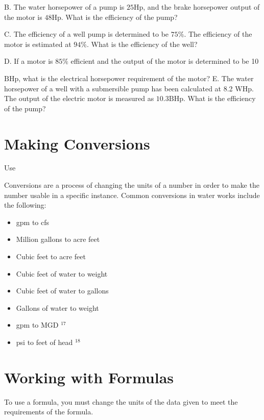 \documentclass[10pt]{article}
\begin{document}
B. The water horsepower of a pump is $25 \mathrm{Hp}$, and the brake horsepower output of the motor is $48 \mathrm{Hp}$. What is the efficiency of the pump?

C. The efficiency of a well pump is determined to be $75 \%$. The efficiency of the motor is estimated at $94 \%$. What is the efficiency of the well?

D. If a motor is $85 \%$ efficient and the output of the motor is determined to be 10

$\mathrm{BHp}$, what is the electrical horsepower requirement of the motor? E. The water horsepower of a well with a submersible pump has been calculated at 8.2 WHp. The output of the electric motor is measured as $10.3 \mathrm{BHp}$. What is the efficiency of the pump?

\section{Making Conversions}
Use

Conversions are a process of changing the units of a number in order to make the number usable in a specific instance. Common conversions in water works include the following:

\begin{itemize}
  \item gpm to cfs

  \item Million gallons to acre feet

  \item Cubic feet to acre feet

  \item Cubic feet of water to weight

  \item Cubic feet of water to gallons

  \item Gallons of water to weight

  \item gpm to MGD ${ }^{17}$

  \item psi to feet of head ${ }^{18}$

\end{itemize}
\section{Working with Formulas}
To use a formula, you must change the units of the data given to meet the requirements of the formula.
\end{document}

